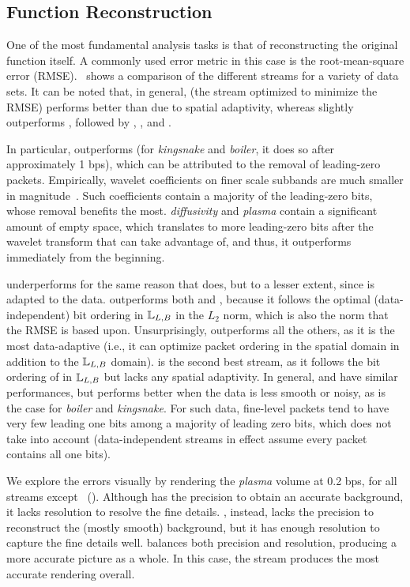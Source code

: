 \subsection{Function Reconstruction}\label{sec:rmse-optimized}

One of the most fundamental analysis tasks is that of reconstructing the original function itself. A
commonly used error metric in this case is the root-mean-square error
(RMSE).~ shows a comparison of the different streams for a variety of data
sets. It can be noted that, in general, \srop (the stream optimized to minimize the RMSE) performs
better than \srsg due to spatial adaptivity, whereas \srsg slightly outperforms \swav, followed by
\sbit, \smag, and \slvl.

In particular, \sbit outperforms \slvl (for \emph{kingsnake} and \emph{boiler}, it does so after
approximately 1 bps), which can be attributed to the removal of leading-zero packets. Empirically,
wavelet coefficients on finer scale subbands are much smaller in magnitude~\cite{spiht1996}. Such
coefficients contain a majority of the leading-zero bits, whose removal benefits \sbit the most.
\emph{diffusivity} and \emph{plasma} contain a significant amount of empty space, which translates
to more leading-zero bits after the wavelet transform that \sbit can take advantage of, and thus,
it outperforms \slvl immediately from the beginning.

\smag underperforms for the same reason that \slvl does, but to a lesser extent, since \smag is
adapted to the data. \swav outperforms both \slvl and \sbit, because it follows the optimal
(data-independent) bit ordering in ${\mathbb L}_{L,B}$ in the $L_2$ norm, which is also the norm that
the RMSE is based upon. Unsurprisingly, \srop outperforms all the others, as it is the most
data-adaptive (i.e., it can optimize packet ordering in the spatial domain in addition to the
${\mathbb L}_{L,B}$ domain). \srsg is the second best stream, as it follows the bit ordering of \srop in
${\mathbb L}_{L,B}$ but lacks any spatial adaptivity. In general, \swav and \ssig have similar
performances, but \ssig performs better when the data is less smooth or noisy, as is the case for
\emph{boiler} and \emph{kingsnake}. For such data, fine-level packets tend to have very few leading
one bits among a majority of leading zero bits, which \swav does not take into account
(data-independent streams in effect assume every packet contains all one bits).

We explore the errors visually by rendering the \emph{plasma} volume at 0.2 bps, for all streams
except \srop ~(). Although \slvl has the precision to obtain an accurate
background, it lacks resolution to resolve the fine details. \sbit, instead, lacks the precision to
reconstruct the (mostly smooth) background, but it has enough resolution to capture the fine details
well. \swav balances both precision and resolution, producing a more accurate picture as a whole. In
this case, the \ssig stream produces the most accurate rendering overall.

